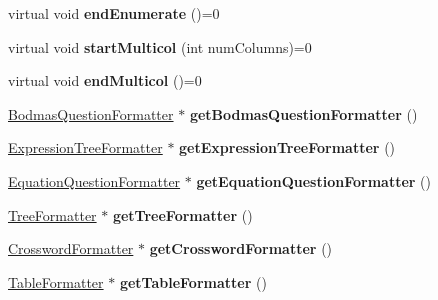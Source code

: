 \begin{DoxyCompactItemize}
\item 
virtual void {\bfseries end\+Enumerate} ()=0\hypertarget{classFormatter_ae618eab17049dee40305b2d989828e8c}{}\label{classFormatter_ae618eab17049dee40305b2d989828e8c}

\item 
virtual void {\bfseries start\+Multicol} (int num\+Columns)=0\hypertarget{classFormatter_a7cf2ea87ddf2bf145e0b1aab77783b9f}{}\label{classFormatter_a7cf2ea87ddf2bf145e0b1aab77783b9f}

\item 
virtual void {\bfseries end\+Multicol} ()=0\hypertarget{classFormatter_a54f2ad368afbd1ebe2756ff2b3c1dc07}{}\label{classFormatter_a54f2ad368afbd1ebe2756ff2b3c1dc07}

\item 
\hyperlink{classBodmasQuestionFormatter}{Bodmas\+Question\+Formatter} $\ast$ {\bfseries get\+Bodmas\+Question\+Formatter} ()\hypertarget{classFormatter_a98e1fd8588a6f54f0d5f0d0ce13e2960}{}\label{classFormatter_a98e1fd8588a6f54f0d5f0d0ce13e2960}

\item 
\hyperlink{classExpressionTreeFormatter}{Expression\+Tree\+Formatter} $\ast$ {\bfseries get\+Expression\+Tree\+Formatter} ()\hypertarget{classFormatter_ab5aecec4b4cbe567ca208f355d546115}{}\label{classFormatter_ab5aecec4b4cbe567ca208f355d546115}

\item 
\hyperlink{classEquationQuestionFormatter}{Equation\+Question\+Formatter} $\ast$ {\bfseries get\+Equation\+Question\+Formatter} ()\hypertarget{classFormatter_a3a2f3fb9176ec9b50d86822381c06a64}{}\label{classFormatter_a3a2f3fb9176ec9b50d86822381c06a64}

\item 
\hyperlink{classTreeFormatter}{Tree\+Formatter} $\ast$ {\bfseries get\+Tree\+Formatter} ()\hypertarget{classFormatter_ac5f9b6234b04f0017a80fd4e74a812d9}{}\label{classFormatter_ac5f9b6234b04f0017a80fd4e74a812d9}

\item 
\hyperlink{classCrosswordFormatter}{Crossword\+Formatter} $\ast$ {\bfseries get\+Crossword\+Formatter} ()\hypertarget{classFormatter_a513014a14b51125c6440dcf46de5386d}{}\label{classFormatter_a513014a14b51125c6440dcf46de5386d}

\item 
\hyperlink{classTableFormatter}{Table\+Formatter} $\ast$ {\bfseries get\+Table\+Formatter} ()\hypertarget{classFormatter_a52ef285118fe34628af60c5ff55cfafc}{}\label{classFormatter_a52ef285118fe34628af60c5ff55cfafc}

\end{DoxyCompactItemize}
